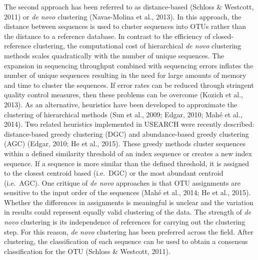 \documentclass[11pt,]{article}
\begin{document}
The second approach has been referred to as distance-based (Schloss \&
Westcott, 2011) or \emph{de novo} clustering (Navas-Molina et al.,
2013). In this approach, the distance between sequences is used to
cluster sequences into OTUs rather than the distance to a reference
database. In contrast to the efficiency of closed-reference clustering,
the computational cost of hierarchical \emph{de novo} clustering methods
scales quadratically with the number of unique sequences. The expansion
in sequencing throughput combined with sequencing errors inflates the
number of unique sequences resulting in the need for large amounts of
memory and time to cluster the sequences. If error rates can be reduced
through stringent quality control measures, then these problems can be
overcome (Kozich et al., 2013). As an alternative, heuristics have been
developed to approximate the clustering of hierarchical methods (Sun et
al., 2009; Edgar, 2010; Mahé et al., 2014). Two related heuristics
implemented in USEARCH were recently described: distance-based greedy
clustering (DGC) and abundance-based greedy clustering (AGC) (Edgar,
2010; He et al., 2015). These greedy methods cluster sequences within a
defined similarity threshold of an index sequence or creates a new index
sequence. If a sequence is more similar than the defined threshold, it
is assigned to the closest centroid based (i.e.~DGC) or the most
abundant centroid (i.e.~AGC). One critique of \emph{de novo} approaches
is that OTU assignments are sensitive to the input order of the
sequences (Mahé et al., 2014; He et al., 2015). Whether the differences
in assignments is meaningful is unclear and the variation in results
could represent equally valid clustering of the data. The strength of
\emph{de novo} clustering is its independence of references for carrying
out the clustering step. For this reason, \emph{de novo} clustering has
been preferred across the field. After clustering, the classification of
each sequence can be used to obtain a consensus classification for the
OTU (Schloss \& Westcott, 2011).
\end{document}
